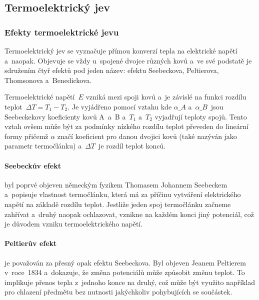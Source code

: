 \subsection{Termoelektrický jev}
\subsubsection{Efekty termoelektrické jevu}
\label{sec:efekty-termoelektrika}
Termoelektrický jev se vyznačuje přímou konverzí tepla na elektrické napětí
a~naopak. Objevuje se vždy u~spojené dvojce různých kovů a~ve své podstatě je
sdružením čtyř efektů pod jeden název: efektu Seebeckova, Peltierova,
Thomsonova a~Benedickova.~

Termoelektrické napětí~$E$ vzniká mezi spoji kovů a~je závislé na funkci
rozdílu teplot~$\Delta T = T_1 - T_2$. Je vyjádřeno pomocí vztahu
kde $\alpha\_A$ a~$\alpha\_B$~jsou  Seebeckekovy koeficienty kovů A~a~B a~$T_1$
a~$T_2$ vyjadřují teploty spojů. Tento vztah ovšem může být za podmínky
nízkého rozdílu teplot převeden do lineární formy
přičemž $\alpha$ značí koeficient pro danou dvojici kovů (také nazýván
jako parametr termočlánku) a~$\Delta T$~je rozdíl teplot konců.~\cite{diplomka}

\paragraph{Seebeckův efekt} byl poprvé objeven německým fyzikem Thomasem
Johannem Seebeckem a~popisuje vlastnost termočlánku, která má za příčinu
vytváření elektrického napětí na základě rozdílu teplot. Jestliže jeden spoj
termočlánku začneme zahřívat a~druhý naopak ochlazovat, vznikne na každém konci
jiný potenciál, což je důvodem vzniku termoelektrického
napětí.~\cite{jreichl-seebeck}

\paragraph{Peltierův efekt} je považován za přesný opak efektu Seebeckova. Byl
objeven Jeanem Peltierem v~roce~1834 a~dokazuje, že změna potenciálů může
způsobit změnu teplot. To implikuje přenos tepla z~jednoho konce na druhý, což
může být využito například pro chlazení předmětu bez nutnosti jakýchkoliv
pohybujících se součástek.~


